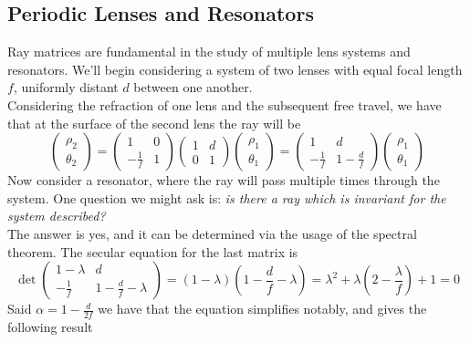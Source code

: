 \documentclass[../electromagnetism.tex]{subfiles}
\begin{document}
\subsection{Periodic Lenses and Resonators}
Ray matrices are fundamental in the study of multiple lens systems and resonators. We'll begin considering a system of two lenses with equal focal length $f$, uniformly distant $d$ between one another.\\
Considering the refraction of one lens and the subsequent free travel, we have that at the surface of the second lens the ray will be
\begin{equation}
	\begin{pmatrix}
		\rho_2\\\theta_2
	\end{pmatrix}=\begin{pmatrix}
		1&0\\-\frac{1}{f}&1
	\end{pmatrix}\begin{pmatrix}
		1&d\\0&1
	\end{pmatrix}\begin{pmatrix}
		\rho_1\\\theta_1
	\end{pmatrix}=\begin{pmatrix}
		1&d\\-\frac{1}{f}&1-\frac{d}{f}
	\end{pmatrix}\begin{pmatrix}
		\rho_1\\\theta_1
	\end{pmatrix}
	\label{eq:resfund.pr}
\end{equation}
Now consider a resonator, where the ray will pass multiple times through the system. One question we might ask is: \textit{is there a ray which is invariant for the system described?}\\
The answer is yes, and it can be determined via the usage of the spectral theorem. The secular equation for the last matrix is
\begin{equation}
	\det\begin{pmatrix}
		1-\lambda&d\\-\frac{1}{f}&1-\frac{d}{f}-\lambda
	\end{pmatrix}=\left( 1-\lambda \right)\left( 1-\frac{d}{f}-\lambda \right)=\lambda^2+\lambda\left( 2-\frac{\lambda}{f} \right)+1=0
	\label{eq:seceq.pr}
\end{equation}
Said $\alpha=1-\frac{d}{2f}$ we have that the equation simplifies notably, and gives the following result
\end{document}
